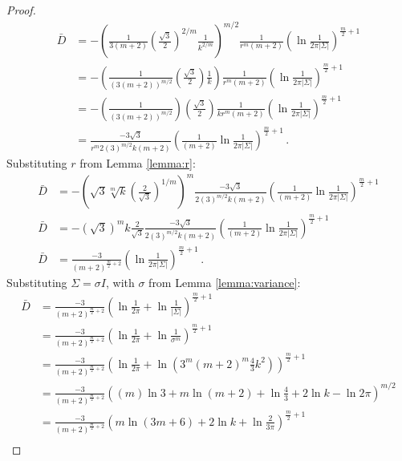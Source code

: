 \begin{proof}
\begin{align*}
      \bar{D} &= -\left(\frac{1}{3(m+2)}\left(\frac{\sqrt{3}}{2}\right)^{2/m}\frac{1}{k^{2/m}}\right)^{m/2} \frac1{r^m(m+2)} \left(\ln{\frac{1}{2\pi |\Sigma|}} \right)^{\frac{m}{2}+1} \\
            &= -\left(\frac{1}{(3(m+2))^{m/2}}\left(\frac{\sqrt{3}}{2}\right)\frac{1}{k}\right) \frac{1}{r^m(m+2)} \left(\ln{\frac{1}{2\pi |\Sigma|}} \right)^{\frac{m}{2}+1} \\
            &= -\left(\frac{1}{(3(m+2))^{m/2}}\right) \left(\frac{\sqrt{3}}{2}\right) \frac{1}{kr^m(m+2)} \left(\ln{\frac{1}{2\pi |\Sigma|}} \right)^{\frac{m}{2}+1} \\
            &=  \frac{-3 \sqrt{3}}{r^m2(3)^{m/2}k(m+2)} \left(\frac{1}{(m+2)}\ln{\frac{1}{2\pi |\Sigma|}} \right)^{\frac{m}{2}+1} \,.
\end{align*}
Substituting $r$ from Lemma \ref{lemma:r}:
\begin{align*}
       \bar{D} &= -\left(\sqrt{3}\sqrt[m]{k}\left(\frac{2}{\sqrt{3}}\right)^{1/m} \right)^m\frac{-3 \sqrt{3}}{2(3)^{m/2}k(m+2)} \left(\frac{1}{(m+2)}\ln{\frac{1}{2\pi |\Sigma|}} \right)^{\frac{m}{2}+1} \\
       \bar{D} &= -(\sqrt{3})^m k\frac{2}{\sqrt{3}} \frac{-3 \sqrt{3}}{2(3)^{m/2}k(m+2)} \left(\frac{1}{(m+2)}\ln{\frac{1}{2\pi |\Sigma|}} \right)^{\frac{m}{2}+1} \\
       \bar{D} &= \frac{-3}{(m+2)^{\frac{m}{2}+2}} \left(\ln{\frac{1}{2\pi |\Sigma|}} \right)^{\frac{m}{2}+1} \,.
\end{align*}
Substituting $\Sigma=\sigma I$, with $\sigma$ from Lemma \ref{lemma:variance}:
\begin{align*}
       \bar{D} &= \frac{-3}{(m+2)^{\frac{m}{2}+2}} \left(\ln{\frac{1}{2\pi}} + \ln{\frac{1}{|\Sigma|}} \right)^{\frac{m}{2}+1} \\
            &= \frac{-3}{(m+2)^{\frac{m}{2}+2}} \left(\ln{\frac{1}{2\pi}} + \ln{\frac{1}{\sigma^m}} \right)^{\frac{m}{2}+1} \\
            &= \frac{-3}{(m+2)^{\frac{m}{2}+2}} \left(\ln{\frac{1}{2\pi}} + \ln{\left(3^m(m+2)^m\frac{4}{3}k^2\right)} \right)^{\frac{m}{2}+1} \\
            &= \frac{-3}{(m+2)^{\frac{m}{2}+2}} \left((m)\ln{3} +m\ln{(m+2)} + \ln{\tfrac{4}{3}} + 2 \ln{k} - \ln{2\pi} \right)^{m/2} \\
            &= \frac{-3}{(m+2)^{\frac{m}{2}+2}} \left(m\ln{(3m+6)} + 2 \ln{k} + \ln{\tfrac{2}{3\pi}} \right)^{\frac{m}{2}+1} \\

\end{align*}
\end{proof}
